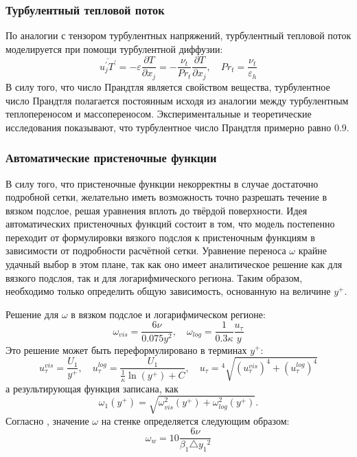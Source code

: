			\subsubsection{Турбулентный тепловой поток}
			По аналогии с тензором турбулентных напряжений, турбулентный тепловой поток моделируется при помощи турбулентной диффузии:
				\begin{equation}
					\overline{u^{'}_jT^{'}} = - \varepsilon \frac{\partial T}{\partial x_j} = -\frac{\nu_t}{Pr_t}\frac{\partial T}{\partial x_j}, \quad Pr_t = \frac{\nu_t}{\varepsilon_h}
				\end{equation}
				В силу того, что число Прандтля является свойством вещества, турбулентное число Прандтля полагается постоянным исходя из аналогии между турбулентным теплопереносом и массопереносом. Экспериментальные и теоретические исследования показывают, что турбулентное число Прандтля примерно равно $0.9$.
			\subsubsection{Автоматические пристеночные функции}
				В силу того, что пристеночные функции некорректны в случае достаточно подробной сетки, желательно иметь возможность точно разрешать течение в вязком подслое, решая уравнения вплоть до твёрдой поверхности. Идея автоматических пристеночных функций состоит в том, что модель постепенно переходит от формулировки вязкого подслоя к пристеночным функциям в зависимости от подробности расчётной сетки. Уравнение переноса $\omega$ крайне удачный выбор в этом плане, так как оно имеет аналитическое решение как для вязкого подслоя, так и для логарифмического региона. Таким образом, необходимо только определить общую зависимость, основанную на величине $y^{+}$.
				
				Решение для $\omega$ в вязком подслое и логарифмическом регионе:
				\begin{equation}
					\omega_{vis} = \frac{6\nu}{0.075 y^2}, \quad \omega_{log} = \frac{1}{0.3 \kappa}\frac{u_{\tau}}{y}
				\end{equation}
				Это решение может быть переформулировано в терминах $y^{+}$:
				\begin{equation}
						u_{\tau}^{vis} = \frac{U_1}{y^{+}}, \quad u_{\tau}^{log} = \frac{U_1}{\frac{1}{\kappa}\ln(y^{+})+C}, \quad u_{\tau} = {}^4\sqrt{(u_{\tau}^{vis})^4 + (u_{\tau}^{log})^4}
				\end{equation}
				а результирующая функция записана, как
				\begin{equation}
					\omega_1(y^{+})=\sqrt{\omega^2_{vis}(y^{+})+\omega^2_{log}(y^{+})}.
				\end{equation}
				Согласно \cite{Garbarek}, значение $\omega$ на стенке определяется следующим образом:
		\begin{equation}
			\omega_w = 10 \frac{6\nu}{\beta_1 \triangle{y_1}^2}
		\end{equation}
	\newpage
	
